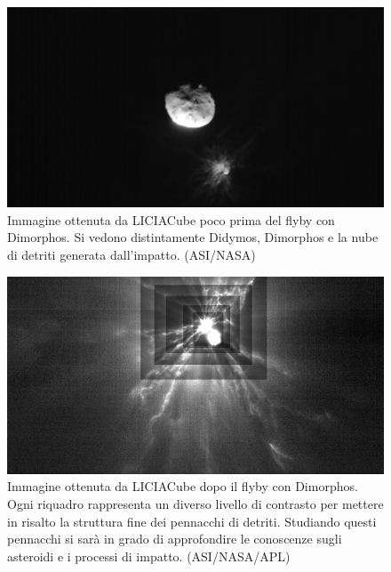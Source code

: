 \documentclass[a4paper,11pt,openright]{book}
\begin{document}
\begin{figure}
    \centering
    \includegraphics[width=\textwidth]{figure/liciacube_impact_1.png}
    \caption[Immagine ottenuta da LICIACube poco prima del flyby con Dimorphos.]{Immagine ottenuta da LICIACube poco prima del flyby con Dimorphos. Si vedono distintamente Didymos, Dimorphos e la nube di detriti generata dall'impatto. (ASI/NASA)}
    \label{fig:liciacube_impact_1}
\end{figure}

\begin{figure}
    \centering
    \includegraphics[width=\textwidth]{figure/liciacube_impact_tot.jpg}
    \caption[Immagine ottenuta da LICIACube dopo il flyby con Dimorphos.]{Immagine ottenuta da LICIACube dopo il flyby con Dimorphos. Ogni riquadro rappresenta un diverso livello di contrasto per mettere in risalto la struttura fine dei pennacchi di detriti. Studiando questi pennacchi si sarà in grado di approfondire le conoscenze sugli asteroidi e i processi di impatto. (ASI/NASA/APL)}
    \label{fig:liciacube_impact_tot}
\end{figure}
\end{document}

